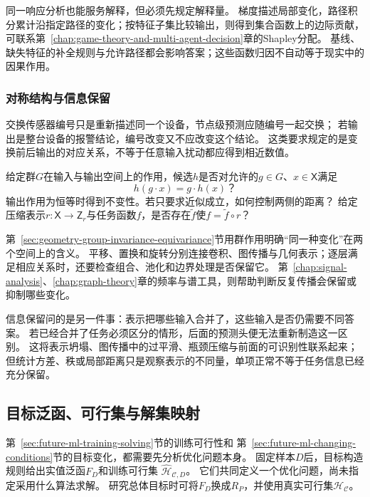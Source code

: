 同一响应分析也能服务解释，但必须先规定解释量。
梯度描述局部变化，路径积分累计沿指定路径的变化；按特征子集比较输出，则得到集合函数上的边际贡献，
可联系第~\ref{chap:game-theory-and-multi-agent-decision}章的Shapley分配。
基线、缺失特征的补全规则与允许路径都会影响答案；这些函数归因不自动等于现实中的因果作用。

\subsubsection{对称结构与信息保留}
\label{sec:future-analysis-structural-property}

交换传感器编号只是重新描述同一个设备，节点级预测应随编号一起交换；
若输出是整台设备的报警结论，编号改变又不应改变这个结论。
这类要求规定的是变换前后输出的对应关系，不等于任意输入扰动都应得到相近数值。

\begin{mathproblem}[候选映射的对称结构与信息保留]
  \label{question:future-structural-property}
  给定群$G$在输入与输出空间上的作用，候选$h$是否对允许的$g\in G$、$x\in\mathsf X$满足
  \[
    h(g\mathbin{\cdot}x)=g\mathbin{\cdot}h(x)\text{？}
  \]
  输出作用为恒等时得到不变性。若只要求近似成立，如何控制两侧的距离？
  给定压缩表示$r:\mathsf X\to\mathsf Z_r$与任务函数$f$，是否存在$\widetilde f$使$f=\widetilde f\circ r$？
\end{mathproblem}

第~\ref{sec:geometry-group-invariance-equivariance}节用群作用明确“同一种变化”在两个空间上的含义。
平移、置换和旋转分别连接卷积、图传播与几何表示；逐层满足相应关系时，还要检查组合、池化和边界处理是否保留它。
第~\ref{chap:signal-analysis}、\ref{chap:graph-theory}章的频率与谱工具，则帮助判断反复传播会保留或抑制哪些变化。

信息保留问的是另一件事：表示把哪些输入合并了，这些输入是否仍需要不同答案。
若已经合并了任务必须区分的情形，后面的预测头便无法重新制造这一区别。
这将表示坍塌、图传播中的过平滑、瓶颈压缩与前面的可识别性联系起来；
但统计方差、秩或局部距离只是观察表示的不同量，单项正常不等于任务信息已经充分保留。

\subsection{目标泛函、可行集与解集映射}
\label{sec:future-objective-object-map}

第~\ref{sec:future-ml-training-solving}节的训练可行性和
第~\ref{sec:future-ml-changing-conditions}节的目标变化，都需要先分析优化问题本身。
固定样本$D$后，目标构造规则给出实值泛函$F_D$和训练可行集
$\widehat{\mathcal H}_{\mathcal C,D}$。
它们共同定义一个优化问题，尚未指定采用什么算法求解。
研究总体目标时可将$F_D$换成$R_P$，并使用真实可行集$\mathcal H_{\mathcal C}$。

